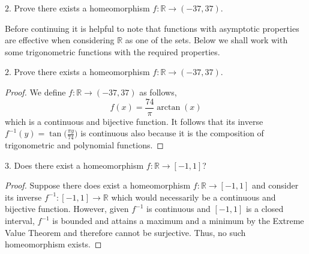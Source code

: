 \documentclass{beamer}
\begin{document}
\begin{frame}{}
\begin{block}{}
$2.$ Prove there exists a homeomorphism $f:\mathbb{R}\to(-37,37)$.
\end{block}
\newline
\newline Before continuing it is helpful to note that functions with asymptotic properties are effective when considering $\mathbb{R}$ as one of the sets. Below we shall work with some trigonometric functions with the required properties.
\end{frame}

\begin{frame}
\begin{block}{}
$2.$ Prove there exists a homeomorphism $f:\mathbb{R}\to(-37,37)$.
\end{block}
\begin{proof}
We define $f:\mathbb{R}\to(-37,37)$ as follows,
$$f(x)=\frac{74}{\pi}\arctan{(x)}$$ which is a continuous and bijective function. It follows that its inverse $f^{-1}(y)=\tan{\Big(\frac{\pi y}{74}\Big)}$ is continuous also because it is the composition of trigonometric and polynomial functions.
\end{proof}
\end{frame}

\begin{frame}{}
$3.$ Does there exist a homeomorphism $f:\mathbb{R}\to[-1,1]$?
\begin{proof}
Suppose there does exist a homeomorphism $f:\mathbb{R}\to[-1,1]$ and consider its inverse $f^{-1}:[-1,1]\to\mathbb{R}$ which would necessarily be a continuous and bijective function. However, given $f^{-1}$ is continuous and $[-1,1]$ is a closed interval, $f^{-1}$ is bounded and attains a maximum and a minimum by the Extreme Value Theorem and therefore cannot be surjective. Thus, no such homeomorphism exists.
\end{proof}    
\end{frame}
\end{document}
